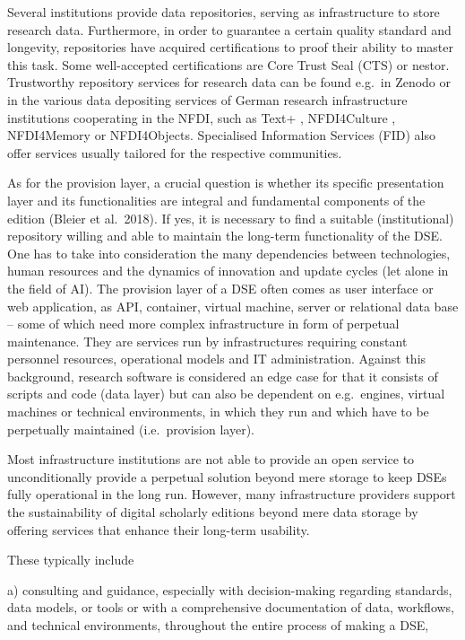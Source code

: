 \documentclass[
  letterpaper,
  DIV=11,
  numbers=noendperiod]{scrreprt}
\begin{document}
Several institutions provide data repositories, serving as
infrastructure to store research data. Furthermore, in order to
guarantee a certain quality standard and longevity, repositories have
acquired certifications to proof their ability to master this task. Some
well-accepted certifications are Core Trust Seal (CTS) or nestor.
Trustworthy repository services for research data can be found e.g.~in
Zenodo or in the various data depositing services of German research
infrastructure institutions cooperating in the NFDI, such as Text+ ,
NFDI4Culture , NFDI4Memory or NFDI4Objects. Specialised Information
Services (FID) also offer services usually tailored for the respective
communities.

As for the provision layer, a crucial question is whether its specific
presentation layer and its functionalities are integral and fundamental
components of the edition (Bleier et al.~2018). If yes, it is necessary
to find a suitable (institutional) repository willing and able to
maintain the long-term functionality of the DSE. One has to take into
consideration the many dependencies between technologies, human
resources and the dynamics of innovation and update cycles (let alone in
the field of AI). The provision layer of a DSE often comes as user
interface or web application, as API, container, virtual machine, server
or relational data base -- some of which need more complex
infrastructure in form of perpetual maintenance. They are services run
by infrastructures requiring constant personnel resources, operational
models and IT administration. Against this background, research software
is considered an edge case for that it consists of scripts and code
(data layer) but can also be dependent on e.g.~engines, virtual machines
or technical environments, in which they run and which have to be
perpetually maintained (i.e.~provision layer).

Most infrastructure institutions are not able to provide an open service
to unconditionally provide a perpetual solution beyond mere storage to
keep DSEs fully operational in the long run. However, many
infrastructure providers support the sustainability of digital scholarly
editions beyond mere data storage by offering services that enhance
their long-term usability.

These typically include

a) consulting and guidance, especially with decision-making regarding
standards, data models, or tools or with a comprehensive documentation
of data, workflows, and technical environments, throughout the entire
process of making a DSE,
\end{document}
